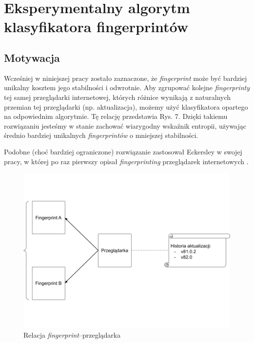 \chapter{Eksperymentalny algorytm klasyfikatora fingerprintów}

\section{Motywacja}
Wcześniej w niniejszej pracy zostało zaznaczone, że \emph{fingerprint} może być
bardziej unikalny kosztem jego stabilności i odwrotnie. Aby zgrupować kolejne
\emph{fingerprinty} tej samej przeglądarki internetowej, których różnice
wynikają z naturalnych przemian tej przeglądarki (np. aktualizacja), możemy użyć
klasyfikatora opartego na odpowiednim algorytmie. Tę relację przedstawia Rys. 7.
Dzięki takiemu rozwiązaniu jesteśmy w stanie zachować wiarygodny wskaźnik
entropii, używając średnio bardziej unikalnych \emph{fingerprintów} o mniejszej
stabilności.

Podobne (choć bardziej ograniczone) rozwiązanie zastosował Eckersley w swojej
pracy, w której po raz pierwszy opisał \emph{fingerprinting} przeglądarek
internetowych \cite[s. 13]{eckersley2010unique}.

\begin{figure}
	\includegraphics[width=\textwidth,keepaspectratio]{img/09}
	\caption{Relacja \emph{fingerprint}--przeglądarka}
\end{figure}

